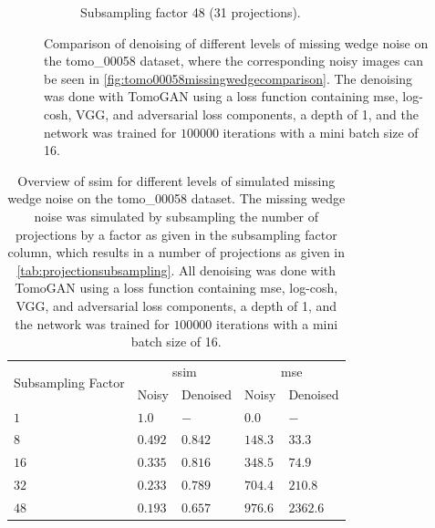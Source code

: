 \begin{figure}
\begin{subfigure}[t]{.45\textwidth}
    \caption{Subsampling factor 48 (31 projections). }
  \end{subfigure}
  \caption[Denoising of four different levels of missing wedge noise]{Comparison of denoising of different levels of missing wedge noise on the tomo\_00058 dataset, where the corresponding noisy images can be seen in \cref{fig:tomo00058missingwedgecomparison}. The denoising was done with TomoGAN using a loss function containing \gls{mse}, log-cosh, VGG, and adversarial loss components, a depth of 1, and the network was trained for $100 000$ iterations with a mini batch size of 16. }
  \label{fig:tomo00058missingwedgecomparisondenoised}
\end{figure}


\begin{table}[htbp]
  \centering
  \caption[SSIM for different levels of simulated missing wedge noise and corresponding values after denoising]{Overview of \gls{ssim} for different levels of simulated missing wedge noise on the tomo\_00058 dataset. The missing wedge noise was simulated by subsampling the number of projections by a factor as given in the subsampling factor column, which results in a number of projections as given in \cref{tab:projectionsubsampling}. All denoising was done with TomoGAN using a loss function containing \gls{mse}, log-cosh, VGG, and adversarial loss components, a depth of 1, and the network was trained for $100 000$ iterations with a mini batch size of 16. }
  \label{tab:missingwedgessim}
  \begin{tabular}{lllll}
  \hline
  \multirow{2}{*}{Subsampling Factor} & \multicolumn{2}{c}{\gls{ssim}} & \multicolumn{2}{c}{\gls{mse}}  \\
  {} & Noisy & Denoised & Noisy & Denoised \\
  \hhline{=====}
  $1$  & $1.0$ & $-$ & $0.0$ & $-$ \\
  $8$  & $0.492$ & $0.842$ & $148.3$ & $33.3$ \\
  $16$ & $0.335$ & $0.816$ & $348.5$ & $74.9$ \\
  $32$ & $0.233$ & $0.789$ & $704.4$ & $210.8$ \\
  $48$ & $0.193$ & $0.657$ & $976.6$ & $2362.6$ \\
  \hline
  \end{tabular}
\end{table}


